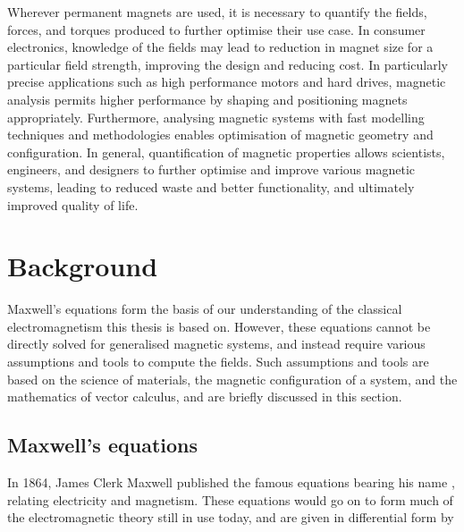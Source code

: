 Wherever permanent magnets are used, it is necessary to quantify the fields, forces, and torques produced to further optimise their use case. In consumer electronics, knowledge of the fields may lead to reduction in magnet size for a particular field strength, improving the design and reducing cost. In particularly precise applications such as high performance motors and hard drives, magnetic analysis permits higher performance by shaping and positioning magnets appropriately. Furthermore, analysing magnetic systems with fast modelling techniques and methodologies enables optimisation of magnetic geometry and configuration. In general, quantification of magnetic properties allows scientists, engineers, and designers to further optimise and improve various magnetic systems, leading to reduced waste and better functionality, and ultimately improved quality of life.


\section{Background}\label{sec:background}
Maxwell's equations form the basis of our understanding of the classical electromagnetism this thesis is based on. However, these equations cannot be directly solved for generalised magnetic systems, and instead require various assumptions and tools to compute the fields. Such assumptions and tools are based on the science of materials, the magnetic configuration of a system, and the mathematics of vector calculus, and are briefly discussed in this section.

\subsection{Maxwell's equations}
In 1864, James Clerk Maxwell published the famous equations bearing his name \cite{Maxwell1865}, relating electricity and magnetism. These equations would go on to form much of the electromagnetic theory still in use today, and are given in differential form by

